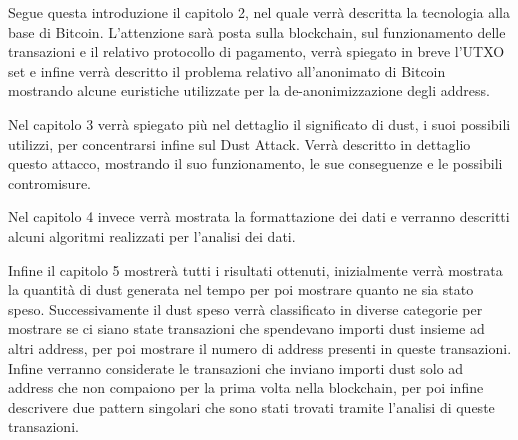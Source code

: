 Segue questa introduzione il capitolo 2, nel quale verrà descritta la tecnologia alla base di Bitcoin. L'attenzione sarà posta sulla blockchain, sul funzionamento delle transazioni e il relativo protocollo di pagamento, verrà spiegato in breve l'UTXO set e infine verrà descritto il problema relativo all'anonimato di Bitcoin mostrando alcune euristiche utilizzate per la de-anonimizzazione degli address.

Nel capitolo 3 verrà spiegato più nel dettaglio il significato di dust, i suoi possibili utilizzi, per concentrarsi infine sul Dust Attack. Verrà descritto in dettaglio questo attacco, mostrando il suo funzionamento, le sue conseguenze e le possibili contromisure.

Nel capitolo 4 invece verrà mostrata la formattazione dei dati e verranno descritti alcuni algoritmi realizzati per l'analisi dei dati.

Infine il capitolo 5 mostrerà tutti i risultati ottenuti, inizialmente verrà mostrata la quantità di dust generata nel tempo per poi mostrare quanto ne sia stato speso. Successivamente il dust speso verrà classificato in diverse categorie per mostrare se ci siano state transazioni che spendevano importi dust insieme ad altri address, per poi mostrare il numero di address presenti in queste transazioni. Infine verranno considerate le transazioni che inviano importi dust solo ad address che non compaiono per la prima volta nella blockchain, per poi infine descrivere due pattern singolari che sono stati trovati tramite l'analisi di queste transazioni.